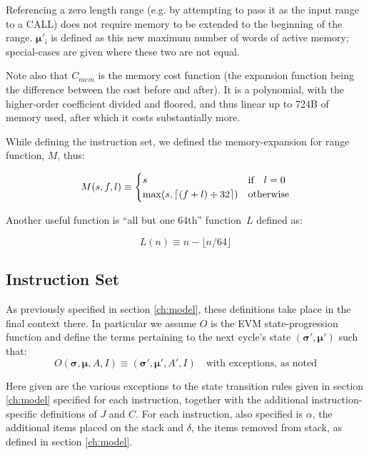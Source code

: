 \documentclass[9pt,oneside]{amsart}
\DeclarePairedDelimiter{\ceil}{\lceil}{\rceil}
\begin{document}
Referencing a zero length range (e.g. by attempting to pass it as the input range to a CALL) does not require memory to be extended to the beginning of the range. $\boldsymbol{\mu}'_{\mathrm{i}}$ is defined as this new maximum number of words of active memory; special-cases are given where these two are not equal.

Note also that $C_{mem}$ is the memory cost function (the expansion function being the difference between the cost before and after). It is a polynomial, with the higher-order coefficient divided and floored, and thus linear up to 724B of memory used, after which it costs substantially more.

While defining the instruction set, we defined the memory-expansion for range function, $M$, thus:

\nopagebreak
\begin{equation}
M(s, f, l) \equiv \begin{cases}
s & \text{if} \quad l = 0 \\
\max(s, \ceil{ (f + l) \div 32 }) & \text{otherwise}
\end{cases}
\end{equation}

Another useful function is ``all but one 64th'' function~$L$ defined as:

\begin{equation}
L(n) \equiv n - \lfloor n / 64 \rfloor
\end{equation}

\subsection{Instruction Set}
\label{subsec:instruction-set}

As previously specified in section \ref{ch:model}, these definitions take place in the final context there. In particular we assume $O$ is the EVM state-progression function and define the terms pertaining to the next cycle's state $(\boldsymbol{\sigma}', \boldsymbol{\mu}')$ such that:
\begin{equation}
O(\boldsymbol{\sigma}, \boldsymbol{\mu}, A, I) \equiv (\boldsymbol{\sigma}', \boldsymbol{\mu}', A', I) \quad \text{with exceptions, as noted}
\end{equation}

Here given are the various exceptions to the state transition rules given in section \ref{ch:model} specified for each instruction, together with the additional instruction-specific definitions of $J$ and $C$. For each instruction, also specified is $\alpha$, the additional items placed on the stack and $\delta$, the items removed from stack, as defined in section \ref{ch:model}.
\end{document}
